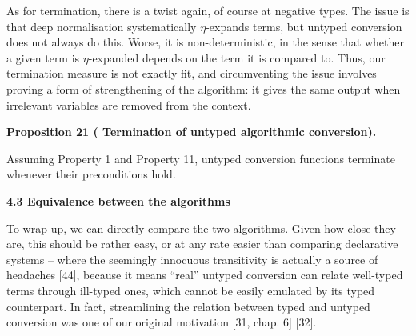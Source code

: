 \documentclass[10pt,a4paper]{amsart}
\begin{document}
 
 
 
As for termination, there is a twist again, of course at negative types. The issue is that deep normalisation systematically $\eta$-expands terms, but untyped conversion does not always do this. Worse, it is non-deterministic, in the sense that whether a given term is $\eta$-expanded depends on the term it is compared to. Thus, our termination measure is not exactly fit, and circumventing the issue involves proving a form of strengthening of the algorithm: it gives the same output when irrelevant variables are removed from the context.\par
 
 
 
\par\medskip\noindent\textbf{Proposition 21 (  Termination of untyped algorithmic conversion).}\par
 
 
Assuming Property 1 and Property 11, untyped conversion functions terminate whenever their preconditions hold.\par
 
 
 


 
\par\medskip\noindent\textbf{4.3 Equivalence between the algorithms}\par
 
 
To wrap up, we can directly compare the two algorithms. Given how close they are, this should be rather easy, or at any rate easier than comparing declarative systems – where the seemingly innocuous transitivity is actually a source of headaches [44], because it means “real” untyped conversion can relate well-typed terms through ill-typed ones, which cannot be easily emulated by its typed counterpart. In fact, streamlining the relation between typed and untyped conversion was one of our original motivation [31, chap. 6] [32].\par
 

 
\end{document}
